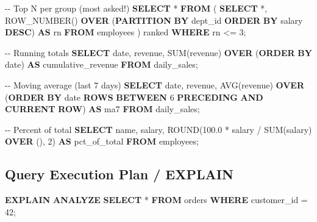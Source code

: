 \documentclass[11pt]{article}
\newenvironment{Shaded}{\begin{snugshade}}{\end{snugshade}}
\newcommand{\CommentTok}[1]{\textcolor[rgb]{0.48,0.49,0.49}{#1}}
\newcommand{\DataTypeTok}[1]{\textcolor[rgb]{0.16,0.50,0.73}{#1}}
\newcommand{\DecValTok}[1]{\textcolor[rgb]{0.96,0.45,0.00}{#1}}
\newcommand{\FloatTok}[1]{\textcolor[rgb]{0.96,0.45,0.00}{#1}}
\newcommand{\FunctionTok}[1]{\textcolor[rgb]{0.56,0.27,0.68}{#1}}
\newcommand{\KeywordTok}[1]{\textcolor[rgb]{0.81,0.81,0.76}{\textbf{#1}}}
\newcommand{\NormalTok}[1]{\textcolor[rgb]{0.81,0.81,0.76}{#1}}
\newcommand{\OperatorTok}[1]{\textcolor[rgb]{0.81,0.81,0.76}{#1}}
\begin{document}
\begin{Shaded}
\begin{Highlighting}[]
\CommentTok{{-}{-} Top N per group (most asked!)}
\KeywordTok{SELECT} \OperatorTok{*} \KeywordTok{FROM}\NormalTok{ (}
    \KeywordTok{SELECT} \OperatorTok{*}\NormalTok{, }\FunctionTok{ROW\_NUMBER}\NormalTok{() }\KeywordTok{OVER}\NormalTok{ (}\KeywordTok{PARTITION} \KeywordTok{BY}\NormalTok{ dept\_id }\KeywordTok{ORDER} \KeywordTok{BY}\NormalTok{ salary }\KeywordTok{DESC}\NormalTok{) }\KeywordTok{AS}\NormalTok{ rn}
    \KeywordTok{FROM}\NormalTok{ employees}
\NormalTok{) ranked}
\KeywordTok{WHERE}\NormalTok{ rn }\OperatorTok{\textless{}=} \DecValTok{3}\NormalTok{;}

\CommentTok{{-}{-} Running totals}
\KeywordTok{SELECT} \DataTypeTok{date}\NormalTok{, revenue,}
       \FunctionTok{SUM}\NormalTok{(revenue) }\KeywordTok{OVER}\NormalTok{ (}\KeywordTok{ORDER} \KeywordTok{BY} \DataTypeTok{date}\NormalTok{) }\KeywordTok{AS}\NormalTok{ cumulative\_revenue}
\KeywordTok{FROM}\NormalTok{ daily\_sales;}

\CommentTok{{-}{-} Moving average (last 7 days)}
\KeywordTok{SELECT} \DataTypeTok{date}\NormalTok{, revenue,}
       \FunctionTok{AVG}\NormalTok{(revenue) }\KeywordTok{OVER}\NormalTok{ (}\KeywordTok{ORDER} \KeywordTok{BY} \DataTypeTok{date} \KeywordTok{ROWS} \KeywordTok{BETWEEN} \DecValTok{6} \KeywordTok{PRECEDING} \KeywordTok{AND} \KeywordTok{CURRENT} \KeywordTok{ROW}\NormalTok{) }\KeywordTok{AS}\NormalTok{ ma7}
\KeywordTok{FROM}\NormalTok{ daily\_sales;}

\CommentTok{{-}{-} Percent of total}
\KeywordTok{SELECT}\NormalTok{ name, salary,}
       \FunctionTok{ROUND}\NormalTok{(}\FloatTok{100.0} \OperatorTok{*}\NormalTok{ salary }\OperatorTok{/} \FunctionTok{SUM}\NormalTok{(salary) }\KeywordTok{OVER}\NormalTok{ (), }\DecValTok{2}\NormalTok{) }\KeywordTok{AS}\NormalTok{ pct\_of\_total}
\KeywordTok{FROM}\NormalTok{ employees;}
\end{Highlighting}
\end{Shaded}

\subsection{Query Execution Plan / EXPLAIN}\label{query-execution-plan--explain}


\begin{Shaded}
\begin{Highlighting}[]
\KeywordTok{EXPLAIN} \KeywordTok{ANALYZE} \KeywordTok{SELECT} \OperatorTok{*} \KeywordTok{FROM}\NormalTok{ orders }\KeywordTok{WHERE}\NormalTok{ customer\_id }\OperatorTok{=} \DecValTok{42}\NormalTok{;}
\end{Highlighting}
\end{Shaded}
\end{document}
